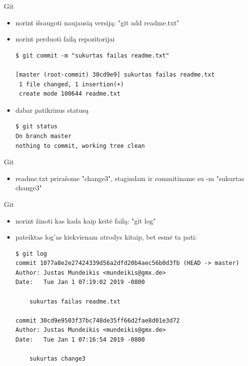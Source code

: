 \documentclass[11pt,xcolor=table]{beamer}
\begin{document}
\begin{frame}[fragile]{Git}
\begin{itemize}
\item norint išsaugoti naujausią versiją: "git add readme.txt"
\item norint perduoti failą repozitorijai
\begin{lstlisting}
$ git commit -m "sukurtas failas readme.txt"

[master (root-commit) 30cd9e9] sukurtas failas readme.txt
 1 file changed, 1 insertion(+)
 create mode 100644 readme.txt
\end{lstlisting}
\item dabar patikrinus statusą
\begin{lstlisting}
$ git status
On branch master
nothing to commit, working tree clean
\end{lstlisting}
\end{itemize}
\end{frame}

\begin{frame}[fragile]{Git}
\begin{itemize}
\item readme.txt prirašome "change3", stagindam ir commitiname su -m "sukurtas change3"
\end{itemize}
\end{frame}

\begin{frame}[fragile]{Git}
\begin{itemize}
\item norint žinoti kas kada kaip keitė failą: "git log"
\item pateiktas log'as kiekvienam atrodys kitaip, bet esmė ta pati:
\begin{lstlisting}
$ git log
commit 1077a8e2e27424339d56a2dfd20b4aec56b0d3fb (HEAD -> master)
Author: Justas Mundeikis <mundeikis@gmx.de>
Date:   Tue Jan 1 07:19:02 2019 -0800

    sukurtas failas readme.txt

commit 30cd9e9503f37bc748de35ff66d2fae8d01e3d72
Author: Justas Mundeikis <mundeikis@gmx.de>
Date:   Tue Jan 1 07:16:54 2019 -0800

    sukurtas change3

\end{lstlisting}
\end{itemize}
\end{frame}
\end{document}
